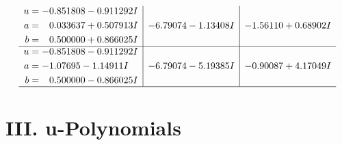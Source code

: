 \documentclass[1p]{elsarticle_modified}
\theoremstyle{definition}
\begin{document}
$$\begin{array}{c|c|c}
\begin{aligned}
u &= -0.851808 - 0.911292 I \\
a &= \phantom{-}0.033637 + 0.507913 I \\
b &= \phantom{-}0.500000 + 0.866025 I\end{aligned}
 & -6.79074 - 1.13408 I & -1.56110 + 0.68902 I \\ \hline\begin{aligned}
u &= -0.851808 - 0.911292 I \\
a &= -1.07695 - 1.14911 I \\
b &= \phantom{-}0.500000 - 0.866025 I\end{aligned}
 & -6.79074 - 5.19385 I & -0.90087 + 4.17049 I\\
 \hline 
 \end{array}$$\newpage
\newpage\renewcommand{\arraystretch}{1}
\centering \section*{ III. u-Polynomials}
\end{document}
